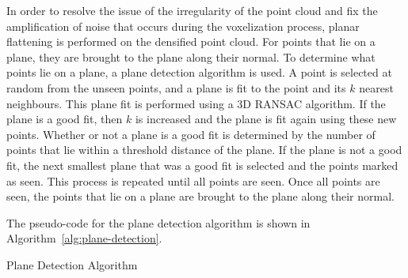 \documentclass[10pt,twocolumn,letterpaper]{article}
\begin{document}
    In order to resolve the issue of the irregularity of the point cloud and fix the amplification of noise that occurs during the voxelization process, planar flattening is performed on the densified point cloud.
    For points that lie on a plane, they are brought to the plane along their normal.
    To determine what points lie on a plane, a plane detection algorithm is used.
    A point is selected at random from the unseen points, and a plane is fit to the point and its $k$ nearest neighbours.
    This plane fit is performed using a 3D RANSAC algorithm.
    If the plane is a good fit, then $k$ is increased and the plane is fit again using these new points. 
    Whether or not a plane is a good fit is determined by the number of points that lie within a threshold distance of the plane.
    If the plane is not a good fit, the next smallest plane that was a good fit is selected and the points marked as seen.
    This process is repeated until all points are seen.
    Once all points are seen, the points that lie on a plane are brought to the plane along their normal.

    The pseudo-code for the plane detection algorithm is shown in Algorithm~\ref{alg:plane-detection}.

    \begin{algorithm}
        \caption{Plane Detection Algorithm}\label{alg:plane-detection}
        \DontPrintSemicolon
        
        \end{algorithm}
    
\end{document}
